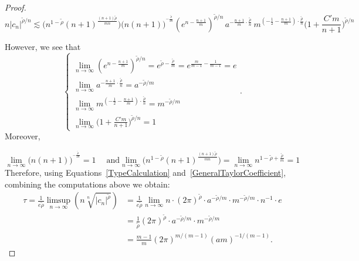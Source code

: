 \documentclass[10pt,a4paper]{amsart}
\begin{document}
\begin{proof}
$$n|c_n|^{\tilde{\rho}/n}\lesssim  \Big(n^{1-\tilde{\rho}}(n+1)^{\frac{(n+1)\tilde{\rho}}{mn}}\Big)\Big( n(n+1) \Big)^{^{-\frac{\tilde{\rho}}{2n}}}(e^{n - \frac{n+1}{m}})^{\tilde{\rho}/n}\, a^{-\frac{n+1}{m}\cdot \frac{\tilde{\rho}}{n}} \, m ^{(-\frac{1}{2}-\frac{n+1}{m})\cdot \frac{\tilde{\rho}}{n}}\Big(1 + \frac{C'm}{n+1}\Big)^{\tilde{\rho}/n}$$

However, we see that 
$$\begin{cases}  \lim_{n\to \infty}(e^{n - \frac{n+1}{m}})^{\tilde{\rho}/n} = e^{\tilde{\rho}- \frac{\tilde{\rho}}{m}} = e^{\frac{m}{m-1} - \frac{1}{m-1}}=e\\
\lim_{n\to \infty} a^{-\frac{n+1}{m}\cdot \frac{\tilde{\rho}}{n}} = a^{-\tilde{\rho}/m}\\\lim_{n\to\infty}m ^{(-\frac{1}{2}-\frac{n+1}{m})\cdot \frac{\tilde{\rho}}{n}} = m^{-\tilde{\rho}/m}\\
\lim_{n\to \infty}\Big(1 + \frac{C'm}{n+1}\Big)^{\tilde{\rho}/n} =1\end{cases}.$$ Moreover,


$$\lim_{n\to \infty}\Big( n(n+1) \Big)^{^{-\frac{\tilde{\rho}}{2n}}} = 1 \;\quad \text{and} \lim_{n\to \infty}\Big(n^{1-\tilde{\rho}}(n+1)^{\frac{(n+1)\tilde{\rho}}{mn}}\Big)=\lim_{n\to \infty} n^{1-\tilde{\rho}+\frac{\tilde{\rho}}{m}}= 1$$
Therefore, using Equations~\eqref{TypeCalculation} and~\eqref{GeneralTaylorCoefficient}, combining the computations above we obtain: 
\begin{align*}
    \tau = \frac{1}{e\tilde{\rho}} \limsup_{n \to\infty} (n \sqrt[n]{|c_n|^{\tilde{\rho}}}) &= \frac{1}{e\tilde{\rho}}\lim_{n\to\infty}n\cdot(2\pi)^{\tilde{\rho}}\cdot a^{-\tilde{\rho}/m}\cdot m^{-\tilde{\rho}/m}\cdot n^{-1}\cdot e\\ 
    &= \frac{1}{\tilde{\rho}}  (2\pi)^{\tilde{\rho}}\cdot a^{-\tilde{\rho}/m}\cdot m^{-\tilde{\rho}/m}\\
    &= \frac{m-1}{m}(2\pi)^{m/(m-1)}(am)^{-1/(m-1)}.
\end{align*}
\end{proof}
\end{document}
